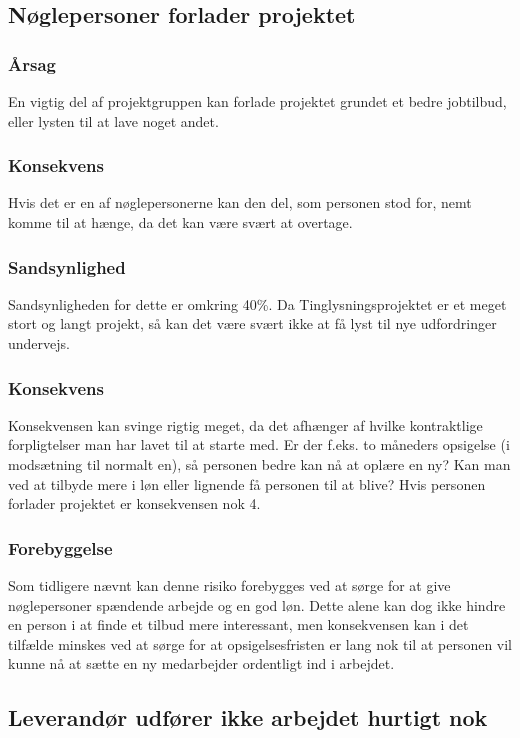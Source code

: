 \documentclass[10pt,a4paper,danish]{article}
\begin{document}
\subsection{Nøglepersoner forlader projektet}
\subsubsection{Årsag}
En vigtig del af projektgruppen kan forlade projektet grundet et bedre jobtilbud, eller lysten til at lave noget andet.

\subsubsection{Konsekvens}
Hvis det er en af nøglepersonerne kan den del, som personen stod for, nemt komme til at hænge, da det kan være svært at overtage. 

\subsubsection{Sandsynlighed}
Sandsynligheden for dette er omkring 40\%. Da Tinglysningsprojektet er et meget stort og langt projekt, så kan det være svært ikke at få lyst til nye udfordringer undervejs.

\subsubsection{Konsekvens}
Konsekvensen kan svinge rigtig meget, da det afhænger af hvilke kontraktlige forpligtelser man har lavet til at starte med. Er der f.eks. to måneders opsigelse (i modsætning til normalt en), så personen bedre kan nå at oplære en ny? Kan man ved at tilbyde mere i løn eller lignende få personen til at blive? Hvis personen forlader projektet er konsekvensen nok 4.

\subsubsection{Forebyggelse}
Som tidligere nævnt kan denne risiko forebygges ved at sørge for at give nøglepersoner spændende arbejde og en god løn. Dette alene kan dog ikke hindre en person i at finde et tilbud mere interessant, men konsekvensen kan i det tilfælde minskes ved at sørge for at opsigelsesfristen er lang nok til at personen vil kunne nå at sætte en ny medarbejder ordentligt ind i arbejdet.



\subsection{Leverandør udfører ikke arbejdet hurtigt nok}
\end{document}
